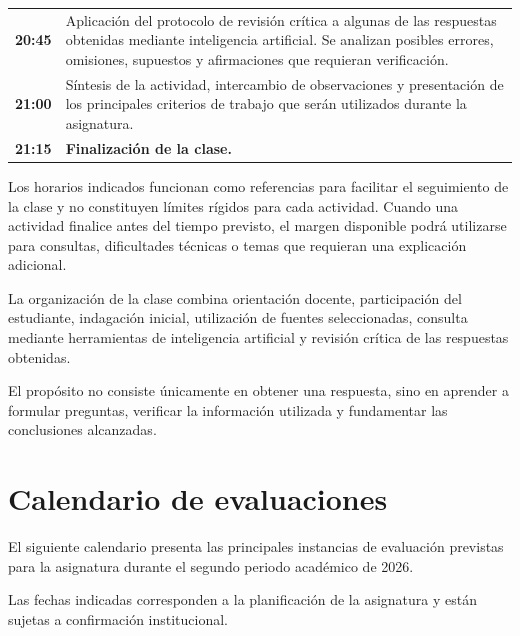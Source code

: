 \documentclass[12pt,a4paper]{article}
\begin{document}
\begin{center}
\begin{tabularx}{\textwidth}{
    >{\centering\arraybackslash}p{2.2cm}
    X
}
\rowcolor{calVerdeClaro}
\textbf{20:45} &
Aplicación del protocolo de revisión crítica a algunas de las respuestas
obtenidas mediante inteligencia artificial. Se analizan posibles errores,
omisiones, supuestos y afirmaciones que requieran verificación. \\

\rowcolor{calAzulClaro}
\textbf{21:00} &
Síntesis de la actividad, intercambio de observaciones y presentación de los
principales criterios de trabajo que serán utilizados durante la asignatura. \\

\rowcolor{calAzul}
\color{white}\textbf{21:15} &
\color{white}\textbf{Finalización de la clase.} \\

\end{tabularx}
\end{center}

\noindent
Los horarios indicados funcionan como referencias para facilitar el seguimiento
de la clase y no constituyen límites rígidos para cada actividad. Cuando una
actividad finalice antes del tiempo previsto, el margen disponible podrá
utilizarse para consultas, dificultades técnicas o temas que requieran una
explicación adicional.

La organización de la clase combina orientación docente, participación del
estudiante, indagación inicial, utilización de fuentes seleccionadas, consulta
mediante herramientas de inteligencia artificial y revisión crítica de las
respuestas obtenidas.

El propósito no consiste únicamente en obtener una respuesta, sino en aprender
a formular preguntas, verificar la información utilizada y fundamentar las
conclusiones alcanzadas.

\section{Calendario de evaluaciones}

El siguiente calendario presenta las principales instancias de evaluación
previstas para la asignatura durante el segundo periodo académico de 2026.

Las fechas indicadas corresponden a la planificación de la asignatura y
están sujetas a confirmación institucional.\parencite{armoa2026planeamiento,ua2026calendarioAcademico}
\end{document}
